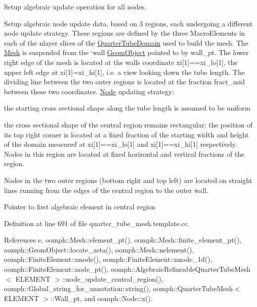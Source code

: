 Setup algebraic update operation for all nodes. 

Setup algebraic node update data, based on 3 regions, each undergoing a different node update strategy. These regions are defined by the three Macro\+Elements in each of the nlayer slices of the \hyperlink{classoomph_1_1QuarterTubeDomain}{Quarter\+Tube\+Domain} used to build the mesh. The \hyperlink{classoomph_1_1Mesh}{Mesh} is suspended from the `wall\textquotesingle{} \hyperlink{classoomph_1_1GeomObject}{Geom\+Object} pointed to by wall\+\_\+pt. The lower right edge of the mesh is located at the wall\textquotesingle{}s coordinate xi\mbox{[}1\mbox{]}==xi\+\_\+lo\mbox{[}1\mbox{]}, the upper left edge at xi\mbox{[}1\mbox{]}=xi\+\_\+hi\mbox{[}1\mbox{]}, i.\+e. a view looking down the tube length. The dividing line between the two outer regions is located at the fraction fract\+\_\+mid between these two coordinates. \hyperlink{classoomph_1_1Node}{Node} updating strategy\+:
\begin{DoxyItemize}
\item the starting cross sectional shape along the tube length is assumed to be uniform
\item the cross sectional shape of the central region remains rectangular; the position of its top right corner is located at a fixed fraction of the starting width and height of the domain measured at xi\mbox{[}1\mbox{]}==xi\+\_\+lo\mbox{[}1\mbox{]} and xi\mbox{[}1\mbox{]}==xi\+\_\+hi\mbox{[}1\mbox{]} respectively. Nodes in this region are located at fixed horizontal and vertical fractions of the region.
\item Nodes in the two outer regions (bottom right and top left) are located on straight lines running from the edges of the central region to the outer wall. 
\end{DoxyItemize}Pointer to first algebraic element in central region 

Definition at line 691 of file quarter\+\_\+tube\+\_\+mesh.\+template.\+cc.



References e, oomph\+::\+Mesh\+::element\+\_\+pt(), oomph\+::\+Mesh\+::finite\+\_\+element\+\_\+pt(), oomph\+::\+Geom\+Object\+::locate\+\_\+zeta(), oomph\+::\+Mesh\+::nelement(), oomph\+::\+Finite\+Element\+::nnode(), oomph\+::\+Finite\+Element\+::nnode\+\_\+1d(), oomph\+::\+Finite\+Element\+::node\+\_\+pt(), oomph\+::\+Algebraic\+Refineable\+Quarter\+Tube\+Mesh$<$ E\+L\+E\+M\+E\+N\+T $>$\+::node\+\_\+update\+\_\+central\+\_\+region(), oomph\+::\+Global\+\_\+string\+\_\+for\+\_\+annotation\+::string(), oomph\+::\+Quarter\+Tube\+Mesh$<$ E\+L\+E\+M\+E\+N\+T $>$\+::\+Wall\+\_\+pt, and oomph\+::\+Node\+::x().



